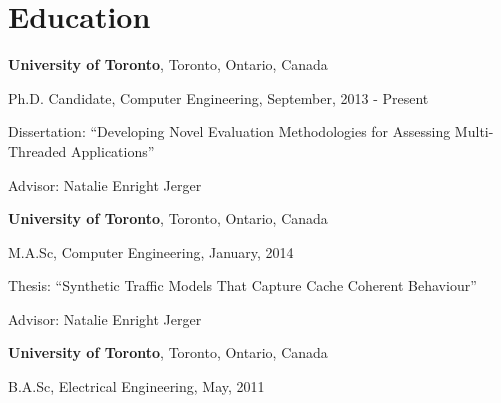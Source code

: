 \section{\sc Education}
{\bf University of Toronto}, Toronto, Ontario, Canada \\
\vspace*{-.1in}
\begin{list1}
\item[] Ph.D. Candidate, Computer Engineering, September, 2013 - Present
\begin{list2}
\vspace*{.05in}
\item[] Dissertation:  ``Developing Novel Evaluation Methodologies for Assessing Multi-Threaded Applications'' 
\item[] Advisor:  Natalie Enright Jerger
\end{list2}
\end{list1}

{\bf University of Toronto}, Toronto, Ontario, Canada \\
\vspace*{-.1in}
\begin{list1}
\item[] M.A.Sc, Computer Engineering,  January, 2014
\begin{list2}
\vspace*{.05in}
\item[] Thesis:  ``Synthetic Traffic Models That Capture Cache Coherent Behaviour'' 
\item[] Advisor:  Natalie Enright Jerger
\end{list2}
\end{list1}

{\bf University of Toronto}, Toronto, Ontario, Canada \\
\vspace*{-.1in}
\begin{list1}
\item[] B.A.Sc, Electrical Engineering,  May, 2011
\end{list1}